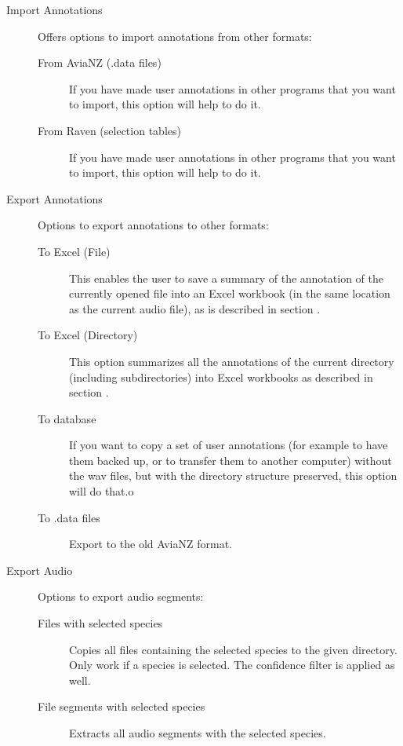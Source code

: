 \documentclass{scrartcl}
\begin{document}
\begin{description}
	\item[Import Annotations] Offers options to import annotations from other formats:
		\begin{description}
	\item [From AviaNZ (.data files)] If you have made user annotations in other programs that you want to import, this option will help to do it.
	\item [From Raven (selection tables)] If you have made user annotations in other programs that you want to import, this option will help to do it.
		\end{description}
	\item[Export Annotations] Options to export annotations to other formats:
		\begin{description}
	\item [To Excel (File)] This enables the user to save a summary of the annotation of the currently opened file into an Excel workbook (in the same location as the current audio file), as is described in section . 
	\item[To Excel (Directory)] This option summarizes all the annotations of the current directory (including subdirectories) into Excel workbooks as described in section .
	\item[To database] If you want to copy a set of user annotations (for example to have them backed up, or to transfer them to another computer) without the wav files, but with the directory structure preserved, this option will do that.o
	\item[To .data files] Export to the old AviaNZ format.
		\end{description}
	\item[Export Audio] Options to export audio segments:
		\begin{description}
			\item[Files with selected species] Copies all files containing the selected species to the given directory.
				Only work if a species is selected.
				The confidence filter is applied as well. 
			\item[File segments with selected species] Extracts all audio segments with the selected species. 

\end{description}
\end{description}
\end{document}
